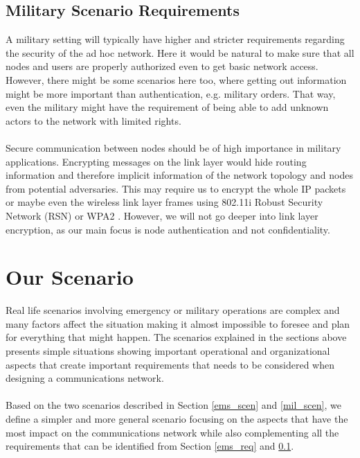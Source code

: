 \subsection{Military Scenario Requirements} \label{mil_req}
A military setting will typically have higher and stricter requirements regarding the security of the ad hoc network. Here it would be natural to make sure that all nodes and users are properly authorized even to get basic network access. However, there might be some scenarios here too, where getting out information might be more important than authentication, e.g. military orders. That way, even the military might have the requirement of being able to add unknown actors to the network with limited rights.
\\\\  
Secure communication between nodes should be of high importance in military applications. Encrypting messages on the link layer would hide routing information and therefore implicit information of the network topology and nodes from potential adversaries. This may require us to encrypt the whole IP packets or maybe even the wireless link layer frames using 802.11i Robust Security Network (RSN) \cite{citeulike:6535654} or WPA2 \cite{edney2004real}. However, we will not go deeper into link layer encryption, as our main focus is node authentication and not confidentiality.


\section{Our Scenario}
Real life scenarios involving emergency or military operations are complex and many factors affect the situation making it almost impossible to foresee and plan for everything that might happen. The scenarios explained in the sections above presents simple situations showing important operational and organizational aspects that create important requirements that needs to be considered when designing a communications network.
\\\\
Based on the two scenarios described in Section \ref{ems_scen} and \ref{mil_scen}, we define a simpler and more general scenario focusing on the aspects that have the most impact on the communications network while also complementing all the requirements that can be identified from Section \ref{ems_req} and \ref{mil_req}.

